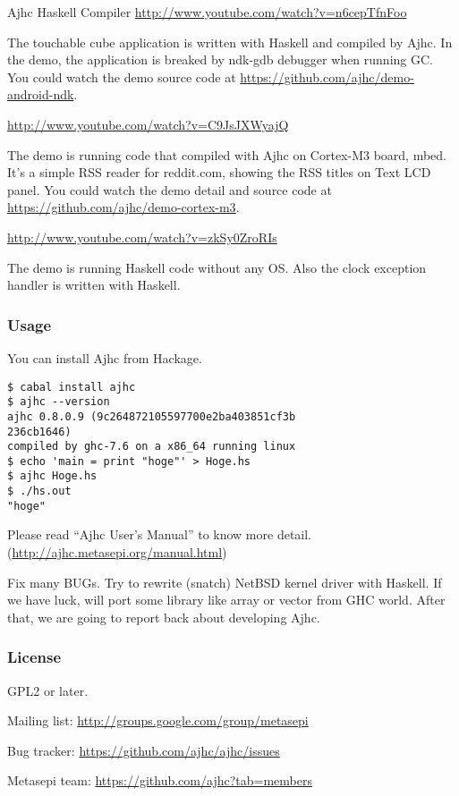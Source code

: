 \begin{hcarentry}{Ajhc Haskell Compiler}
\noindent \url{http://www.youtube.com/watch?v=n6cepTfnFoo}

The touchable cube application is written with Haskell and compiled by Ajhc.
In the demo, the application is breaked by ndk-gdb debugger when running GC.
You could watch the demo source code at \url{https://github.com/ajhc/demo-android-ndk}.

\Separate

\noindent \url{http://www.youtube.com/watch?v=C9JsJXWyajQ}

The demo is running code that compiled with Ajhc on Cortex-M3 board, mbed. It's a simple RSS reader for reddit.com, showing the RSS titles on Text LCD panel. You could watch the demo detail and source code at \url{https://github.com/ajhc/demo-cortex-m3}.

\Separate

\noindent \url{http://www.youtube.com/watch?v=zkSy0ZroRIs}

The demo is running Haskell code without any OS.
Also the clock exception handler is written with Haskell.

\subsubsection*{Usage}

You can install Ajhc from Hackage.

\begin{verbatim}
$ cabal install ajhc
$ ajhc --version
ajhc 0.8.0.9 (9c264872105597700e2ba403851cf3b
236cb1646)
compiled by ghc-7.6 on a x86_64 running linux
$ echo 'main = print "hoge"' > Hoge.hs
$ ajhc Hoge.hs
$ ./hs.out
"hoge"
\end{verbatim}

Please read ``Ajhc User's Manual'' to know more detail. (\url{http://ajhc.metasepi.org/manual.html})

\FuturePlans

Fix many BUGs. Try to rewrite (snatch) NetBSD kernel driver with Haskell. If we have luck, will port some library like array or vector from GHC world. After that, we are going to report back about developing Ajhc.

\subsubsection*{License}

GPL2 or later.

\Contact
  \begin{compactitem}
    \item Mailing list: \url{http://groups.google.com/group/metasepi}
    \item Bug tracker: \url{https://github.com/ajhc/ajhc/issues}
    \item Metasepi team: \url{https://github.com/ajhc?tab=members}
  \end{compactitem}


\end{hcarentry}
